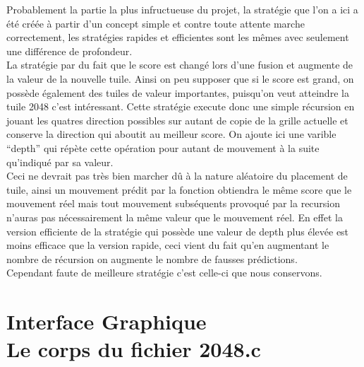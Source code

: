 \documentclass[12pt]{article}
\begin{document}
Probablement la partie la plus infructueuse du projet, la stratégie que l'on a ici a été créée à partir d'un concept simple et contre toute attente marche correctement, les stratégies rapides et efficientes sont les mêmes avec seulement une différence de profondeur.\\

La stratégie par du fait que le score est changé lors d'une fusion et augmente de la valeur de la nouvelle tuile. Ainsi on peu supposer que si le score est grand, on possède également des tuiles de valeur importantes, puisqu'on veut atteindre la tuile 2048 c'est intéressant. Cette stratégie execute donc une simple récursion en jouant les quatres direction possibles sur autant de copie de la grille actuelle et conserve la direction qui aboutit au meilleur score. On ajoute ici une varible ``depth'' qui répète cette opération pour autant de mouvement à la suite qu'indiqué par sa valeur.\\

Ceci ne devrait pas très bien marcher dû à la nature aléatoire du placement de tuile, ainsi un mouvement prédit par la fonction obtiendra le même score que le mouvement réel mais tout mouvement subséquents provoqué par la recursion n'auras pas nécessairement la même valeur que le mouvement réel. En effet la version efficiente de la stratégie qui possède une valeur de depth plus élevée est moins efficace que la version rapide, ceci vient du fait qu'en augmentant le nombre de récursion on augmente le nombre de fausses prédictions.\\

Cependant faute de meilleure stratégie c'est celle-ci que nous conservons.

\section{Interface Graphique
\\{\small Le corps du fichier 2048.c}}
\end{document}
